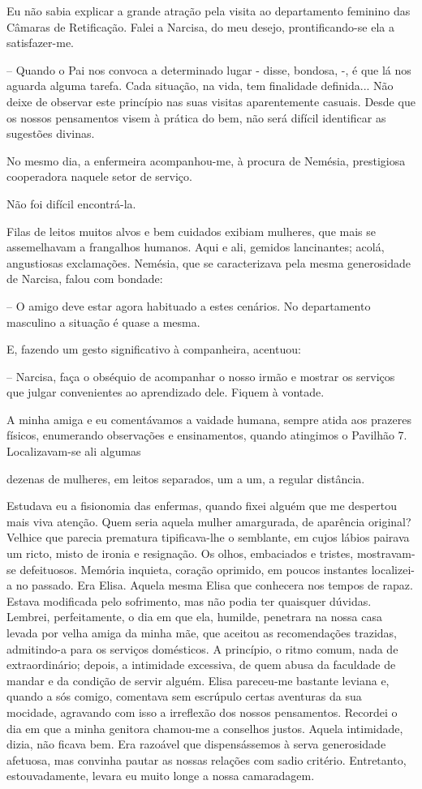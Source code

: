 \documentclass[portuguese,12pt,a4paper]{scrbook}
\begin{document}
	Eu não sabia explicar a grande atração pela visita ao departamento feminino das Câmaras de Retificação. Falei a Narcisa, do meu desejo, prontificando-se ela a satisfazer-me.
	
	– Quando o Pai nos convoca a determinado lugar - disse, bondosa, -, é que lá nos aguarda alguma tarefa. Cada situação, na vida, tem finalidade definida... Não deixe de observar este princípio nas suas visitas aparentemente casuais. Desde que os nossos pensamentos visem à prática do bem, não será difícil identificar as sugestões divinas.
	
	No mesmo dia, a enfermeira acompanhou-me, à procura de Nemésia, prestigiosa cooperadora naquele setor de serviço.
	
	Não foi difícil encontrá-la.
	
	Filas de leitos muitos alvos e bem cuidados exibiam mulheres, que mais se assemelhavam a frangalhos humanos. Aqui e ali, gemidos lancinantes; acolá, angustiosas exclamações. Nemésia, que se caracterizava pela mesma generosidade de Narcisa, falou com bondade:
	
	– O amigo deve estar agora habituado a estes cenários. No departamento masculino a situação é quase a mesma.
	
	E, fazendo um gesto significativo à companheira, acentuou:
	
	– Narcisa, faça o obséquio de acompanhar o nosso irmão e mostrar os serviços que julgar convenientes ao aprendizado dele. Fiquem à vontade.
	
	A minha amiga e eu comentávamos a vaidade humana, sempre atida aos prazeres físicos, enumerando observações e ensinamentos, quando atingimos o Pavilhão 7. Localizavam-se ali algumas
	
	
	dezenas de mulheres, em leitos separados, um a um, a regular distância.
	
	Estudava eu a fisionomia das enfermas, quando fixei alguém que me despertou mais viva atenção. Quem seria aquela mulher amargurada, de aparência original? Velhice que parecia prematura tipificava-lhe o semblante, em cujos lábios pairava um ricto, misto de ironia e resignação. Os olhos, embaciados e tristes, mostravam-se defeituosos. Memória inquieta, coração oprimido, em poucos instantes localizei-a no passado. Era Elisa. Aquela mesma Elisa que conhecera nos tempos de rapaz. Estava modificada pelo sofrimento, mas não podia ter quaisquer dúvidas. Lembrei, perfeitamente, o dia em que ela, humilde, penetrara na nossa casa levada por velha amiga da minha mãe, que aceitou as recomendações trazidas, admitindo-a para os serviços domésticos. A princípio, o ritmo comum, nada de extraordinário; depois, a intimidade excessiva, de quem abusa da faculdade de mandar e da condição de servir alguém. Elisa pareceu-me bastante leviana e, quando a sós comigo, comentava sem escrúpulo certas aventuras da sua mocidade, agravando com isso a irreflexão dos nossos pensamentos. Recordei o dia em que a minha genitora chamou-me a conselhos justos. Aquela intimidade, dizia, não ficava bem. Era razoável que dispensássemos à serva generosidade afetuosa, mas convinha pautar as nossas relações com sadio critério. Entretanto, estouvadamente, levara eu muito longe a nossa camaradagem.
	
\end{document}
